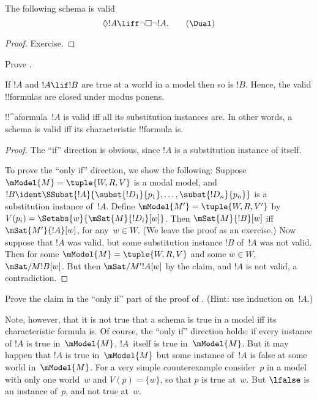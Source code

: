 \documentclass[../../../include/open-logic-section]{subfiles}
\begin{document}
\begin{prop}
  The following schema \Dual{} is valid
  \[
  \Diamond !A \liff \lnot\Box\lnot !A. \tag{\Dual}
  \]
\end{prop}

\begin{proof}
  Exercise.
\end{proof}

\begin{prob}
  Prove .
\end{prob}

\begin{prop}
  If $!A$ and $!A \lif !B$ are true at a world in a model
  then so is $!B$. Hence, the valid !!{formula}s are closed under
  modus ponens.
\end{prop}

\begin{prop}
  !!^a{formula}~$!A$ is valid iff all its substitution instances
  are. In other words, a schema is valid iff its characteristic
  !!{formula} is.
\end{prop}

\begin{proof}
  The ``if'' direction is obvious, since $!A$ is a substitution
  instance of itself.

  To prove the ``only if'' direction, we show the following: Suppose
  $\mModel{M} = \tuple{W, R, V}$ is a modal model, and $!B \ident
  \SSubst{!A}{\subst{!D_1}{p_1},\dots,\subst{!D_n}{p_n}}$ is a
  substitution instance of~$!A$. Define $\mModel{M'} = \tuple{W, R,
    V'}$ by $V(p_i) = \Setabs{w}{\mSat{M}{!D_i}[w]}$.  Then
  $\mSat{M}{!B}[w]$ iff $\mSat{M'}{!A}[w]$, for any~$w \in W$. (We
  leave the proof as an exercise.) Now suppose that $!A$ was valid,
  but some substitution instance $!B$ of~$!A$ was not valid. Then for
  some $\mModel{M} = \tuple{W, R, V}$ and some $w \in W$,
  $\mSat/{M}{!B}[w]$. But then $\mSat/{M'}{!A}[w]$ by the claim, and
  $!A$ is not valid, a contradiction.
\end{proof}

\begin{prob}
  Prove the claim in the ``only if'' part of the proof of
  . (Hint: use induction
  on~$!A$.)
\end{prob}

Note, however, that it is not true that a schema is true in a model
iff its characteristic formula is. Of course, the ``only if''
direction holds: if every instance of $!A$ is true in~$\mModel{M}$,
$!A$~itself is true in~$\mModel{M}$. But it may happen that $!A$ is
true in~$\mModel{M}$ but some instance of~$!A$ is false at some world
in~$\mModel{M}$. For a very simple counterexample consider~$p$ in a
model with only one world~$w$ and $V(p) = \{w\}$, so that $p$ is true
at~$w$. But $\lfalse$ is an instance of~$p$, and not true at~$w$.
\end{document}

